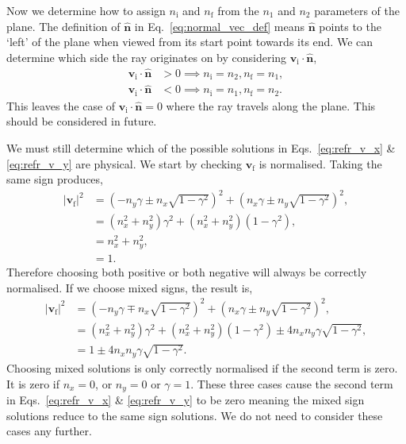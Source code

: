 \documentclass{article}
\let\vec \bm
\newcommand{\mrm}[1]{\mathrm{#1}}
\begin{document}
Now we determine how to assign $n_\mrm{i}$ and $n_\mrm{f}$ from the $n_1$ and $n_2$ parameters of the plane. The definition of $\vec{\hat{n}}$ in Eq.~\ref{eq:normal_vec_def} means $\vec{\hat{n}}$ points to the `left' of the plane when viewed from its start point towards its end. We can determine which side the ray originates on by considering $\vec{v_\mrm{i}} \cdot \vec{\hat{n}}$,
\begin{align}
    \vec{v_\mrm{i}} \cdot \vec{\hat{n}} 
    &>
    0
    \implies
    n_\mrm{i} = n_2, n_\mrm{f} = n_1, \\
    \vec{v_\mrm{i}} \cdot \vec{\hat{n}} 
    &<
    0
    \implies
    n_\mrm{i} = n_1, n_\mrm{f} = n_2.
\end{align}
This leaves the case of $\vec{v_\mrm{i}} \cdot \vec{\hat{n}} = 0$ where the ray travels along the plane. This should be considered in future.

We must still determine which of the possible solutions in Eqs.~\ref{eq:refr_v_x} \& \ref{eq:refr_v_y} are physical. We start by checking $\vec{v}_\mrm{f}$ is normalised. Taking the same sign produces,
\begin{align}
    |\vec{v}_\mrm{f}|^2
    &=
    (-n_y \gamma \pm n_x \sqrt{1-\gamma^2})^2
    +
    (n_x \gamma \pm n_y \sqrt{1-\gamma^2})^2, \\
    &=
    (n_x^2 + n_y^2)\gamma^2 + (n_x^2 + n_y^2)(1-\gamma^2), \\
    &=
    n_x^2 + n_y^2, \\
    &= 1.
\end{align}
Therefore choosing both positive or both negative will always be correctly normalised. If we choose mixed signs, the result is,
\begin{align}
    |\vec{v}_\mrm{f}|^2
    &=
    (-n_y \gamma \mp n_x \sqrt{1-\gamma^2})^2
    +
    (n_x \gamma \pm n_y \sqrt{1-\gamma^2})^2, \\
    &=
    (n_x^2 + n_y^2)\gamma^2 + (n_x^2 + n_y^2)(1-\gamma^2)
    \pm
    4 n_x n_y \gamma \sqrt{1-\gamma^2}, \\
    &=
    1
    \pm
    4 n_x n_y \gamma \sqrt{1-\gamma^2}.
\end{align}
Choosing mixed solutions is only correctly normalised if the second term is zero. It is zero if $n_x=0$, or $n_y=0$ or $\gamma=1$. These three cases cause the second term in Eqs.~\ref{eq:refr_v_x} \& \ref{eq:refr_v_y} to be zero meaning the mixed sign solutions reduce to the same sign solutions. We do not need to consider these cases any further.
\end{document}
